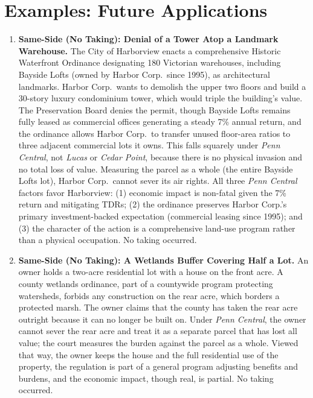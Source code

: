 \documentclass[12pt]{article}
\begin{document}
\section{Examples: Future Applications}
\begin{enumerate}

\item \textbf{Same-Side (No Taking): Denial of a Tower Atop a Landmark Warehouse.} The City of Harborview enacts a comprehensive Historic Waterfront Ordinance designating 180 Victorian warehouses, including Bayside Lofts (owned by Harbor Corp.\ since 1995), as architectural landmarks. Harbor Corp.\ wants to demolish the upper two floors and build a 30-story luxury condominium tower, which would triple the building's value. The Preservation Board denies the permit, though Bayside Lofts remains fully leased as commercial offices generating a steady 7\% annual return, and the ordinance allows Harbor Corp.\ to transfer unused floor-area ratios to three adjacent commercial lots it owns. This falls squarely under \textit{Penn Central}, not \textit{Lucas} or \textit{Cedar Point}, because there is no physical invasion and no total loss of value. Measuring the parcel as a whole (the entire Bayside Lofts lot), Harbor Corp.\ cannot sever its air rights. All three \textit{Penn Central} factors favor Harborview: (1) economic impact is non-fatal given the 7\% return and mitigating TDRs; (2) the ordinance preserves Harbor Corp.'s primary investment-backed expectation (commercial leasing since 1995); and (3) the character of the action is a comprehensive land-use program rather than a physical occupation. No taking occurred.

\item \textbf{Same-Side (No Taking): A Wetlands Buffer Covering Half a Lot.} An owner holds a two-acre residential lot with a house on the front acre. A county wetlands ordinance, part of a countywide program protecting watersheds, forbids any construction on the rear acre, which borders a protected marsh. The owner claims that the county has taken the rear acre outright because it can no longer be built on. Under \textit{Penn Central}, the owner cannot sever the rear acre and treat it as a separate parcel that has lost all value; the court measures the burden against the parcel as a whole. Viewed that way, the owner keeps the house and the full residential use of the property, the regulation is part of a general program adjusting benefits and burdens, and the economic impact, though real, is partial. No taking occurred.


\end{enumerate}
\end{document}
